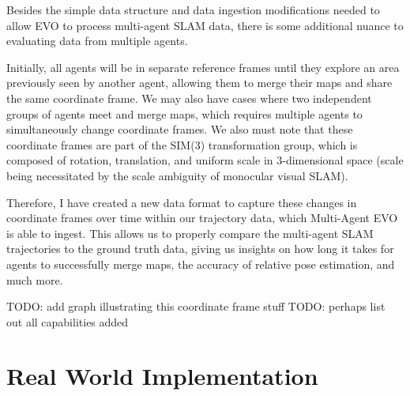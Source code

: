 Besides the simple data structure and data ingestion modifications needed to allow EVO to process multi-agent SLAM data, there is some additional nuance to evaluating data from multiple agents.

Initially, all agents will be in separate reference frames until they explore an area previously seen by another agent, allowing them to merge their maps and share the same coordinate frame. We may also have cases where two independent groups of agents meet and merge maps, which requires multiple agents to simultaneously change coordinate frames. We also must note that these coordinate frames are part of the SIM(3) transformation group, which is composed of rotation, translation, and uniform scale in 3-dimensional space (scale being necessitated by the scale ambiguity of monocular visual SLAM).

Therefore, I have created a new data format to capture these changes in coordinate frames over time within our trajectory data, which Multi-Agent EVO is able to ingest. This allows us to properly compare the multi-agent SLAM trajectories to the ground truth data, giving us insights on how long it takes for agents to successfully merge maps, the accuracy of relative pose estimation, and much more.

TODO: add graph illustrating this coordinate frame stuff
TODO: perhaps list out all capabilities added

\section{Real World Implementation}
\label{sec:real-world-implementation}





